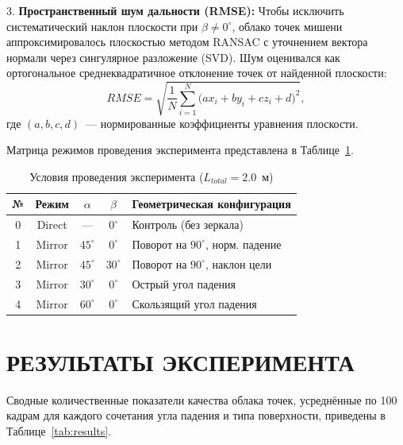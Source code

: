 \documentclass{misisarticle}
\begin{document}
3. \textbf{Пространственный шум дальности (RMSE):} Чтобы исключить систематический наклон плоскости при $\beta \neq 0^\circ$, облако точек мишени аппроксимировалось плоскостью методом RANSAC с уточнением вектора нормали через сингулярное разложение (SVD). Шум оценивался как ортогональное среднеквадратичное отклонение точек от найденной плоскости:
\begin{equation}
RMSE = \sqrt{ \frac{1}{N} \sum_{i=1}^{N} \big( a x_i + b y_i + c z_i + d \big)^2 },
\end{equation}
где $(a,b,c,d)$~--- нормированные коэффициенты уравнения плоскости.

Матрица режимов проведения эксперимента представлена в Таблице~\ref{tab:conditions}.

\begin{table}[htbp]
\caption{Условия проведения эксперимента ($L_{total} = 2.0$~м)}
\label{tab:conditions}
\centering
\footnotesize
\setlength{\tabcolsep}{4pt}
\begin{tabular}{ccccl}
\toprule
№ & Режим & $\alpha$ & $\beta$ & Геометрическая конфигурация \\
\midrule
0 & Direct & --- & $0^\circ$ & Контроль (без зеркала) \\
1 & Mirror & $45^\circ$ & $0^\circ$ & Поворот на $90^\circ$, норм. падение \\
2 & Mirror & $45^\circ$ & $30^\circ$ & Поворот на $90^\circ$, наклон цели \\
3 & Mirror & $30^\circ$ & $0^\circ$ & Острый угол падения \\
4 & Mirror & $60^\circ$ & $0^\circ$ & Скользящий угол падения \\
\bottomrule
\end{tabular}
\end{table}

\section{РЕЗУЛЬТАТЫ ЭКСПЕРИМЕНТА}

Сводные количественные показатели качества облака точек, усреднённые по 100 кадрам для каждого сочетания угла падения и типа поверхности, приведены в Таблице~\ref{tab:results}.
\end{document}
